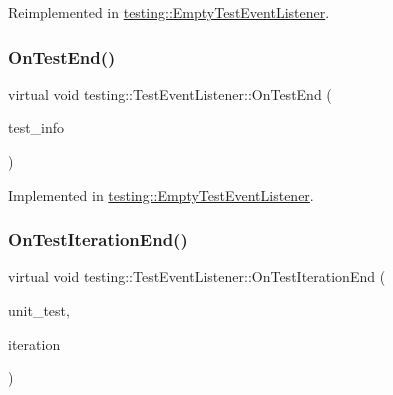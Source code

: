 Reimplemented in \hyperlink{classtesting_1_1EmptyTestEventListener_a7f9a84967fde01000b7a56e9e84b6052}{testing\+::\+Empty\+Test\+Event\+Listener}.

\mbox{\label{classtesting_1_1TestEventListener_abb1c44525ef038500608b5dc2f17099b}} 
\subsubsection{\texorpdfstring{On\+Test\+End()}{OnTestEnd()}}
{\footnotesize\ttfamily virtual void testing\+::\+Test\+Event\+Listener\+::\+On\+Test\+End (\begin{DoxyParamCaption}\item[{const \hyperlink{classtesting_1_1TestInfo}{Test\+Info} \&}]{test\+\_\+info }\end{DoxyParamCaption})\hspace{0.3cm}{\ttfamily [pure virtual]}}



Implemented in \hyperlink{classtesting_1_1EmptyTestEventListener_a709d7077c086c877d214231bc520ef90}{testing\+::\+Empty\+Test\+Event\+Listener}.

\mbox{\label{classtesting_1_1TestEventListener_a550fdb3e55726e4cefa09f5697941425}} 
\subsubsection{\texorpdfstring{On\+Test\+Iteration\+End()}{OnTestIterationEnd()}}
{\footnotesize\ttfamily virtual void testing\+::\+Test\+Event\+Listener\+::\+On\+Test\+Iteration\+End (\begin{DoxyParamCaption}\item[{const \hyperlink{classtesting_1_1UnitTest}{Unit\+Test} \&}]{unit\+\_\+test,  }\item[{int}]{iteration }\end{DoxyParamCaption})\hspace{0.3cm}{\ttfamily [pure virtual]}}



